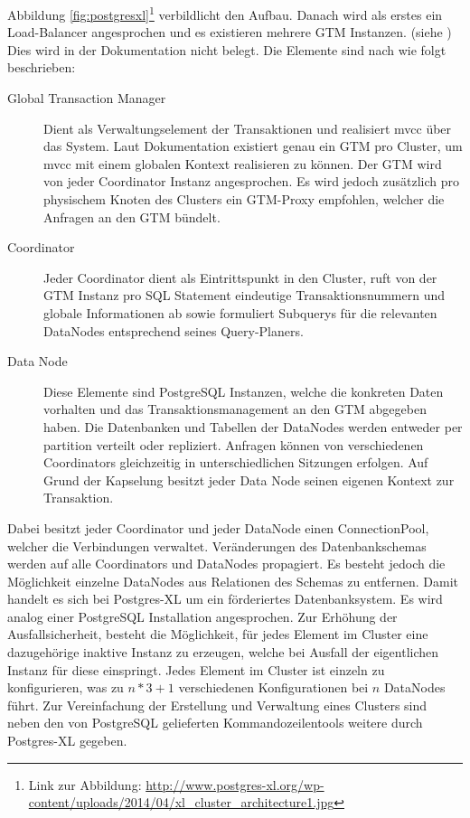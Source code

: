 Abbildung \ref{fig:postgresxl}\footnote{Link zur Abbildung: \url{http://www.postgres-xl.org/wp-content/uploads/2014/04/xl_cluster_architecture1.jpg}} verbildlicht den Aufbau.
Danach wird als erstes ein Load-Balancer angesprochen und es existieren mehrere GTM Instanzen. (siehe \cite{website:postgresxl-about})
Dies wird in der Dokumentation nicht belegt.
Die Elemente sind nach \cite{website:postgresxl-about} wie folgt beschrieben:
\begin{description}
\item[Global Transaction Manager] Dient als Verwaltungselement der Transaktionen und realisiert \Gls{mvcc} über das System. Laut Dokumentation existiert genau ein GTM pro Cluster, um \Gls{mvcc}  mit einem globalen Kontext realisieren zu können. Der GTM wird von jeder Coordinator Instanz angesprochen. Es wird jedoch zusätzlich pro physischem Knoten des Clusters ein GTM-Proxy empfohlen, welcher die Anfragen an den GTM bündelt.
\item[Coordinator] Jeder Coordinator dient als Eintrittspunkt in den Cluster, ruft von der GTM Instanz pro SQL Statement eindeutige Transaktionsnummern und globale Informationen ab sowie formuliert Subquerys für die relevanten DataNodes entsprechend seines Query-Planers.
\item[Data Node] Diese Elemente sind PostgreSQL Instanzen, welche die konkreten Daten vorhalten und das Transaktionsmanagement an den GTM abgegeben haben. Die Datenbanken und Tabellen der DataNodes werden entweder per partition verteilt oder repliziert. Anfragen können von verschiedenen Coordinators gleichzeitig in unterschiedlichen Sitzungen erfolgen. Auf Grund der Kapselung besitzt jeder Data Node seinen eigenen Kontext zur Transaktion.
\end{description}
Dabei besitzt jeder Coordinator und jeder DataNode einen ConnectionPool, welcher die Verbindungen verwaltet.
Veränderungen des Datenbankschemas werden auf alle Coordinators und DataNodes propagiert.
Es besteht jedoch die Möglichkeit einzelne DataNodes aus Relationen des Schemas zu entfernen.
Damit handelt es sich bei Postgres-XL um ein förderiertes Datenbanksystem.
Es wird analog einer PostgreSQL Installation angesprochen.
Zur Erhöhung der Ausfallsicherheit, besteht die Möglichkeit, für jedes Element im Cluster eine dazugehörige inaktive Instanz zu erzeugen, welche bei Ausfall der eigentlichen Instanz für diese einspringt.
Jedes Element im Cluster ist einzeln zu konfigurieren, was zu $ n*3+1 $ verschiedenen Konfigurationen bei $n$ DataNodes führt.
Zur Vereinfachung der Erstellung und Verwaltung eines Clusters sind neben den von PostgreSQL gelieferten Kommandozeilentools weitere durch Postgres-XL gegeben.
